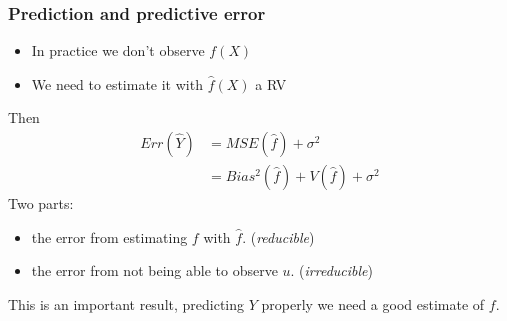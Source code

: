 \documentclass[
  shownotes,
  xcolor={svgnames},
  hyperref={colorlinks,citecolor=DarkBlue,linkcolor=DarkRed,urlcolor=DarkBlue}
  ]{beamer}
\begin{document}
\begin{frame}
\frametitle{Prediction and predictive error}

\begin{itemize}
  \item In practice we don't observe $f(X)$
  \item We need to estimate it with $\hat f(X)$ a RV 

\end{itemize}

\bigskip
Then 
\begin{align}
  Err (\hat Y )  &= MSE(\hat f) + \sigma^2  \\
                 &= Bias^2(\hat f) + V(\hat f) + \sigma^2
\end{align}
\bigskip
Two parts:
\begin{itemize}
  \item  the error from estimating $f$ with $\hat f$. (\emph{reducible})
  \item  the error from not being able to observe $u$. (\emph{irreducible})
\end{itemize}

\bigskip

This is an important result, predicting $Y$ properly we need a good estimate of $f$.

\end{frame}
\end{document}

